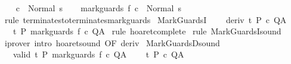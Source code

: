 \begin{isabellebody}
\ \ \isamarkupfalse%
\ {\isachardoublequoteopen}{\isasymGamma}{\isasymturnstile}c\ {\isasymdown}\ Normal\ s{\isachardoublequoteclose}\isacommand{{\isachardot}}\isamarkupfalse%
\isanewline
\ \ \isamarkupfalse%
\ {\isachardoublequoteopen}{\isasymGamma}{\isasymturnstile}mark{\isacharunderscore}guards\ f\ c\ {\isasymdown}\ Normal\ s{\isachardoublequoteclose}\isanewline
\ \ \ \ \isamarkupfalse%
\ {\isacharparenleft}rule\ terminates{\isacharunderscore}to{\isacharunderscore}terminates{\isacharunderscore}mark{\isacharunderscore}guards{\isacharparenright}\isanewline
{}\isamarkupfalse%
%
\endisatagproof
{\isafoldproof}%
%
\isadelimproof
\isanewline
%
\endisadelimproof
\isanewline
{}\isamarkupfalse%
\ MarkGuardsI{\isacharcolon}\ \isanewline
\ \ \ deriv{\isacharcolon}\ {\isachardoublequoteopen}{\isasymGamma}{\isacharcomma}{\isasymTheta}{\isasymturnstile}\isactrlsub t\isactrlbsub {\isacharslash}{\isacharbraceleft}{\isacharbraceright}\isactrlesub \ P\ c\ Q{\isacharcomma}A{\isachardoublequoteclose}\isanewline
\ \ \ {\isachardoublequoteopen}{\isasymGamma}{\isacharcomma}{\isasymTheta}{\isasymturnstile}\isactrlsub t\isactrlbsub {\isacharslash}{\isacharbraceleft}{\isacharbraceright}\isactrlesub \ P\ mark{\isacharunderscore}guards\ f\ c\ Q{\isacharcomma}A{\isachardoublequoteclose}\isanewline
%
\isadelimproof
%
\endisadelimproof
%
\isatagproof
{}\isamarkupfalse%
\ {\isacharparenleft}rule\ hoaret{\isacharunderscore}complete{\isacharprime}{\isacharparenright}\isanewline
{}\isamarkupfalse%
\ {\isacharparenleft}rule\ MarkGuardsI{\isacharunderscore}sound{\isacharparenright}\isanewline
{}\isamarkupfalse%
\ {\isacharparenleft}iprover\ intro{\isacharcolon}\ hoaret{\isacharunderscore}sound\ {\isacharbrackleft}OF\ deriv{\isacharbrackright}{\isacharparenright}\isanewline
{}\isamarkupfalse%
%
\endisatagproof
{\isafoldproof}%
%
\isadelimproof
\isanewline
%
\endisadelimproof
\isanewline
\isanewline
{}\isamarkupfalse%
\ MarkGuardsD{\isacharunderscore}sound{\isacharcolon}\ \isanewline
\ \ \ valid{\isacharcolon}\ {\isachardoublequoteopen}{\isasymGamma}{\isacharcomma}{\isasymTheta}{\isasymTurnstile}\isactrlsub t\isactrlbsub {\isacharslash}{\isacharbraceleft}{\isacharbraceright}\isactrlesub \ P\ mark{\isacharunderscore}guards\ f\ c\ Q{\isacharcomma}A{\isachardoublequoteclose}\ \isanewline
\ \ \ {\isachardoublequoteopen}{\isasymGamma}{\isacharcomma}{\isasymTheta}{\isasymTurnstile}\isactrlsub t\isactrlbsub {\isacharslash}{\isacharbraceleft}{\isacharbraceright}\isactrlesub \ P\ c\ Q{\isacharcomma}A{\isachardoublequoteclose}\isanewline

\end{isabellebody}

